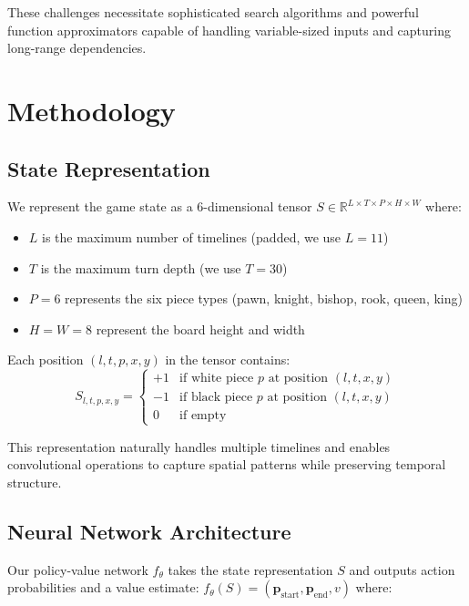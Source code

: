 \documentclass{article}
\begin{document}
These challenges necessitate sophisticated search algorithms and powerful function approximators capable of handling variable-sized inputs and capturing long-range dependencies.

\section{Methodology}

\subsection{State Representation}

We represent the game state as a 6-dimensional tensor $S \in \mathbb{R}^{L \times T \times P \times H \times W}$ where:
\begin{itemize}
    \item $L$ is the maximum number of timelines (padded, we use $L=11$)
    \item $T$ is the maximum turn depth (we use $T=30$)
    \item $P=6$ represents the six piece types (pawn, knight, bishop, rook, queen, king)
    \item $H=W=8$ represent the board height and width
\end{itemize}

Each position $(l, t, p, x, y)$ in the tensor contains:
\begin{equation}
S_{l,t,p,x,y} = \begin{cases}
+1 & \text{if white piece } p \text{ at position } (l,t,x,y) \\
-1 & \text{if black piece } p \text{ at position } (l,t,x,y) \\
0 & \text{if empty}
\end{cases}
\end{equation}

This representation naturally handles multiple timelines and enables convolutional operations to capture spatial patterns while preserving temporal structure.

\subsection{Neural Network Architecture}

Our policy-value network $f_\theta$ takes the state representation $S$ and outputs action probabilities and a value estimate: $f_\theta(S) = (\mathbf{p}_{\text{start}}, \mathbf{p}_{\text{end}}, v)$ where:
\end{document}
